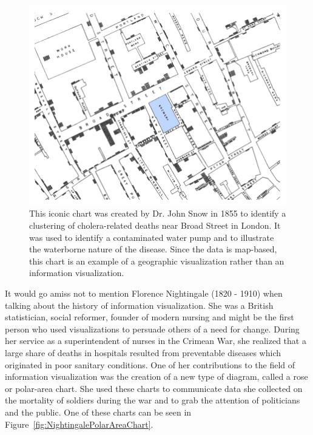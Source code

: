 \begin{figure}[tp]
\centering
\includegraphics[keepaspectratio,width=\linewidth,height=\fullh / 3]{images/cholera-dot-map.png}
\caption[Dot Map Plotting Cholera Deaths in London From 1855]{
  This iconic chart was created by Dr. John Snow in 1855 to identify a clustering of cholera-related deaths near Broad Street in London.
  It was used to identify a contaminated water pump and to illustrate the waterborne nature of the disease.
  Since the data is map-based, this chart is an example of a geographic visualization rather than an information visualization.
}
\label{fig:CholeraDotMap}
\end{figure}

It would go amiss not to mention Florence Nightingale (1820 - 1910) \parencite{FlorenceNightingale} when talking about the history of information visualization.
She was a British statistician, social reformer, founder of modern nursing and might be the first person who used visualizations to persuade others of a need for change.
During her service as a superintendent of nurses in the Crimean War, she realized that a large share of deaths in hospitals resulted from preventable diseases which originated in poor sanitary conditions.
One of her contributions to the field of information visualization was the creation of a new type of diagram, called a rose or polar-area chart.
She used these charts to communicate data she collected on the mortality of soldiers during the war and to grab the attention of politicians and the public.
One of these charts can be seen in Figure~\ref{fig:NightingalePolarAreaChart}.

